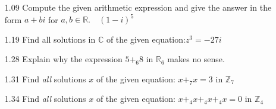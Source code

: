 \documentclass[12pt]{article}
\newcommand{\Z}{\mathds{Z}}
\newcommand{\C}{\mathbb{C}}
\newcommand{\R}{\mathbb{R}}
\begin{document}
\begin{enumerate}
\begin{enumerate}
\begin{proof}
$$\begin{aligned}
				\text{Notice.}\\
				r-s&=-(s-r) \\
				&\Rightarrow -s(-r)=nq\\
				&\Rightarrow s-r = n(-q)\\
			\end{aligned}
			$$
			As $n|s-r$ and $s\sim r$.\\
			Thus, $\sim$ is symmetric.\\
			Assume $r\sim s$ and $s \sim t$ for some $t \in \Z$. Then, $r-s=nq$ and $s-t=np$ for some $p\in \Z$. Notice $s=np+t$\\
			Then, $r-s = nq$
			$$\begin{aligned}
				&\Rightarrow r-(np+t)=nq \\
				&\Rightarrow r-np-t=nq \\
				&\Rightarrow r-t=nq+np=n(q+p)
			\end{aligned}$$
			As $(q+p) \in \Z, n|r-t,$ and $r\sim t$ \\
			Thus, $\sim$ is transitive \\
			Therefore, $\sim$ satisfies the conditions of being and equivalence relation.
		\end{proof}
		\item Show that, when restricted to the subset $\Z^+$ of $\Z$, this $\sim$ is the equivalence relation, \textit{congruence modulo n} of Example 0.20
		\item The cells of this partition of $\Z$ are \textit{residue classes modulo n} in $\Z$. Repeat Exercise 35 for the residue classes modulo $n$ in $\Z$ rather than in $\Z^+$ using the notation $\{\cdots,\#,\#,\#,\cdots\}$ for these infinite sets.
	\end{enumerate}
	\item[1.09] Compute the given arithmetic expression and give the answer in the form $a + bi$ for $a,b \in \R .\quad (1-i)^5 $
		
	\item[1.19] Find all solutions in $\C$ of the given equation:\quad $z^3 = -27i$
	
	\item[1.28] Explain why the expression $5+_6 8$ in $\R_6$ makes no sense.
	
	\item[1.31] Find \textit{all} solutions $x$ of the given equation: \quad $x+_7x=3$ in $\Z_7$
	
	\item[1.34] Find \textit{all} solutions $x$ of the given equation: \quad $x+_4x+_4x+_4x=0$ in $\Z_4$
	

\end{enumerate}
\end{document}
